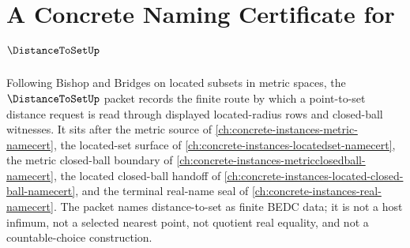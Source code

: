 \chapter{A Concrete Naming Certificate for $\DistanceToSetUp$}
\label{ch:concrete-instances-distance-to-set-namecert}

Following Bishop and Bridges on located subsets in metric spaces, the $\DistanceToSetUp$ packet records the finite route by which a point-to-set distance request is read through displayed located-radius rows and closed-ball witnesses. It sits after the metric source of \autoref{ch:concrete-instances-metric-namecert}, the located-set surface of \autoref{ch:concrete-instances-locatedset-namecert}, the metric closed-ball boundary of \autoref{ch:concrete-instances-metricclosedball-namecert}, the located closed-ball handoff of \autoref{ch:concrete-instances-located-closed-ball-namecert}, and the terminal real-name seal of \autoref{ch:concrete-instances-real-namecert}. The packet names distance-to-set as finite BEDC data; it is not a host infimum, not a selected nearest point, not quotient real equality, and not a countable-choice construction.

